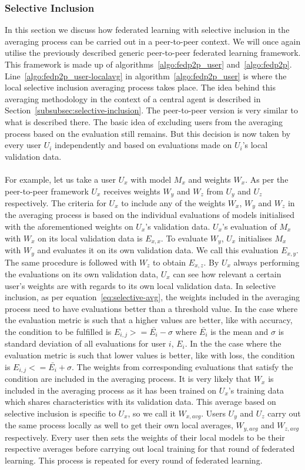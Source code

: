 \documentclass[12pt]{article}
\begin{document}
\subsubsection{Selective Inclusion}
In this section we discuss how federated learning with selective inclusion in the averaging process can be carried out in a peer-to-peer context. We will once again utilise the previously described generic peer-to-peer federated learning framework. This framework is made up of algorithms~\ref{algo:fedp2p_user} and~\ref{algo:fedp2p}. Line~\ref{algo:fedp2p_user-localavg} in algorithm~\ref{algo:fedp2p_user} is where the local selective inclusion averaging process takes place. The idea behind this averaging methodology in the context of a central agent is described in Section~\ref{subsubsec:selective-inclusion}. The peer-to-peer version is very similar to what is described there. The basic idea of excluding users from the averaging process based on the evaluation still remains. But this decision is now taken by every user $U_i$ independently and based on evaluations made on $U_i$'s local validation data.
\\\\
For example, let us take a user $U_x$ with model $M_x$ and weights $W_x$. As per the peer-to-peer framework $U_x$ receives weights $W_y$ and $W_z$ from $U_y$ and $U_z$ respectively. The criteria for $U_x$ to include any of the weights $W_x$, $W_y$ and $W_z$ in the averaging process is based on the individual evaluations of models initialised with the aforementioned weights on $U_x$'s validation data. $U_x$'s evaluation of $M_x$ with $W_x$ on its local validation data is $E_{x,x}$. To evaluate $W_y$, $U_x$ initialises $M_x$ with $W_y$ and evaluates it on its own validation data. We call this evaluation $E_{x,y}$. The same procedure is followed with $W_z$ to obtain $E_{x,z}$. By $U_x$ always performing the evaluations on its own validation data, $U_x$ can see how relevant a certain user's weights are with regards to its own local validation data. In selective inclusion, as per equation~\ref{eq:selective-avg}, the weights included in the averaging process need to have evaluations better than a threshold value. In the case where the evaluation metric is such that a higher values are better, like with accuracy, the condition to be fulfilled is $E_{i,j} >= \bar{E_i}-\sigma$ where $\bar{E_i}$ is the mean and $\sigma$ is standard deviation of all evaluations for user $i$, $E_i$. In the the case where the evaluation metric is such that lower values is better, like with loss, the condition is $E_{i,j} <= \bar{E_i}+\sigma$. The weights from corresponding evaluations that satisfy the condition are included in the averaging process. It is very likely that $W_x$ is included in the averaging process as it has been trained on $U_x$'s training data which shares characteristics with its validation data. This average based on selective inclusion is specific to $U_x$, so we call it $W_{x,avg}$. Users $U_y$ and $U_z$ carry out the same process locally as well to get their own local averages, $W_{y,avg}$ and $W_{z,avg}$ respectively. Every user then sets the weights of their local models to be their respective averages before carrying out local training for that round of federated learning. This process is repeated for every round of federated learning.
\end{document}
